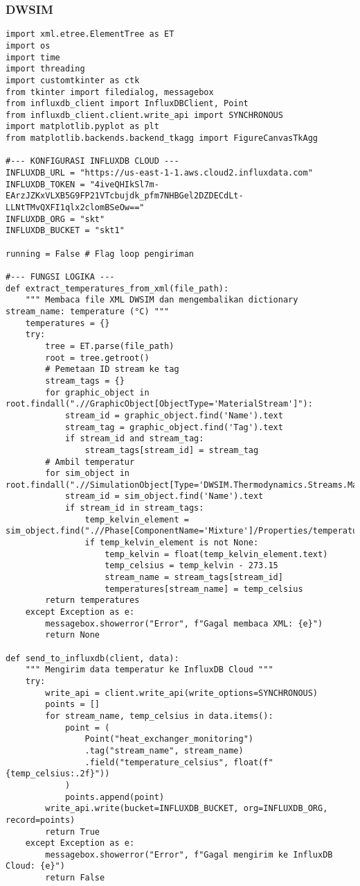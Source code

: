 \documentclass[a4paper, 12pt]{article}
\begin{document}
\subsubsection{DWSIM}
\begin{lstlisting}[style=pythonstyle, caption={DWSIM (python)}]
import xml.etree.ElementTree as ET
import os
import time
import threading
import customtkinter as ctk
from tkinter import filedialog, messagebox
from influxdb_client import InfluxDBClient, Point
from influxdb_client.client.write_api import SYNCHRONOUS
import matplotlib.pyplot as plt
from matplotlib.backends.backend_tkagg import FigureCanvasTkAgg

#--- KONFIGURASI INFLUXDB CLOUD ---
INFLUXDB_URL = "https://us-east-1-1.aws.cloud2.influxdata.com"
INFLUXDB_TOKEN = "4iveQHIkSl7m-EArzJZKxVLXB5G9FP21VTcbujdk_pfm7NHBGel2DZDECdLt-LLNtTMvQXFI1qlx2clomBSeOw=="
INFLUXDB_ORG = "skt"
INFLUXDB_BUCKET = "skt1"

running = False # Flag loop pengiriman

#--- FUNGSI LOGIKA ---
def extract_temperatures_from_xml(file_path):
    """ Membaca file XML DWSIM dan mengembalikan dictionary stream_name: temperature (°C) """
    temperatures = {}
    try:
        tree = ET.parse(file_path)
        root = tree.getroot()
        # Pemetaan ID stream ke tag
        stream_tags = {}
        for graphic_object in root.findall(".//GraphicObject[ObjectType='MaterialStream']"):
            stream_id = graphic_object.find('Name').text
            stream_tag = graphic_object.find('Tag').text
            if stream_id and stream_tag:
                stream_tags[stream_id] = stream_tag
        # Ambil temperatur
        for sim_object in root.findall(".//SimulationObject[Type='DWSIM.Thermodynamics.Streams.MaterialStream']"):
            stream_id = sim_object.find('Name').text
            if stream_id in stream_tags:
                temp_kelvin_element = sim_object.find(".//Phase[ComponentName='Mixture']/Properties/temperature")
                if temp_kelvin_element is not None:
                    temp_kelvin = float(temp_kelvin_element.text)
                    temp_celsius = temp_kelvin - 273.15
                    stream_name = stream_tags[stream_id]
                    temperatures[stream_name] = temp_celsius
        return temperatures
    except Exception as e:
        messagebox.showerror("Error", f"Gagal membaca XML: {e}")
        return None

def send_to_influxdb(client, data):
    """ Mengirim data temperatur ke InfluxDB Cloud """
    try:
        write_api = client.write_api(write_options=SYNCHRONOUS)
        points = []
        for stream_name, temp_celsius in data.items():
            point = (
                Point("heat_exchanger_monitoring")
                .tag("stream_name", stream_name)
                .field("temperature_celsius", float(f"{temp_celsius:.2f}"))
            )
            points.append(point)
        write_api.write(bucket=INFLUXDB_BUCKET, org=INFLUXDB_ORG, record=points)
        return True
    except Exception as e:
        messagebox.showerror("Error", f"Gagal mengirim ke InfluxDB Cloud: {e}")
        return False


\end{lstlisting}
\end{document}
